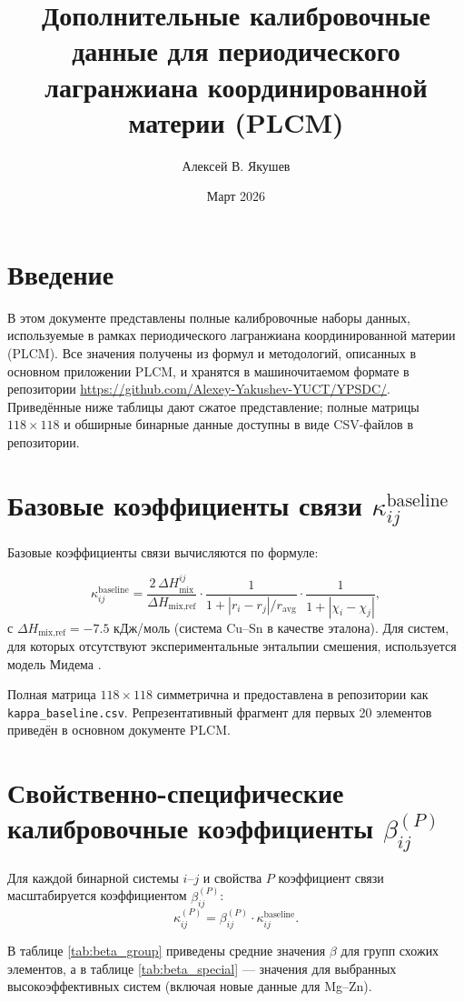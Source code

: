 \documentclass[12pt,a4paper]{article}
\title{Дополнительные калибровочные данные для периодического лагранжиана координированной материи (PLCM)}
\author{Алексей В. Якушев}
\date{Март 2026}
\begin{document}
	\maketitle
	
	\tableofcontents
	\newpage
	
	\section{Введение}
	В этом документе представлены полные калибровочные наборы данных, используемые в рамках периодического лагранжиана координированной материи (PLCM). Все значения получены из формул и методологий, описанных в основном приложении PLCM, и хранятся в машиночитаемом формате в репозитории \url{https://github.com/Alexey-Yakushev-YUCT/YPSDC/}. Приведённые ниже таблицы дают сжатое представление; полные матрицы $118\times118$ и обширные бинарные данные доступны в виде CSV-файлов в репозитории.
	
	\section{Базовые коэффициенты связи $\kappa_{ij}^{\text{baseline}}$}
	Базовые коэффициенты связи вычисляются по формуле:
	
	\[
	\kappa_{ij}^{\text{baseline}} = \frac{2\,\Delta H_{\text{mix}}^{ij}}{\Delta H_{\text{mix,ref}}} \cdot
	\frac{1}{1 + |r_i - r_j|/r_{\text{avg}}} \cdot
	\frac{1}{1 + |\chi_i - \chi_j|},
	\]
	с $\Delta H_{\text{mix,ref}} = -7.5$ кДж/моль (система Cu–Sn в качестве эталона). Для систем, для которых отсутствуют экспериментальные энтальпии смешения, используется модель Мидема \cite{Miedema1980}.
	
	Полная матрица $118\times118$ симметрична и предоставлена в репозитории как \texttt{kappa\_baseline.csv}. Репрезентативный фрагмент для первых 20 элементов приведён в основном документе PLCM.
	
	\section{Свойственно-специфические калибровочные коэффициенты $\beta_{ij}^{(P)}$}
	Для каждой бинарной системы $i$–$j$ и свойства $P$ коэффициент связи масштабируется коэффициентом $\beta_{ij}^{(P)}$:
	\[
	\kappa_{ij}^{(P)} = \beta_{ij}^{(P)} \cdot \kappa_{ij}^{\text{baseline}}.
	\]
	
	В таблице \ref{tab:beta_group} приведены средние значения $\beta$ для групп схожих элементов, а в таблице \ref{tab:beta_special} — значения для выбранных высокоэффективных систем (включая новые данные для Mg–Zn).
	
\end{document}
